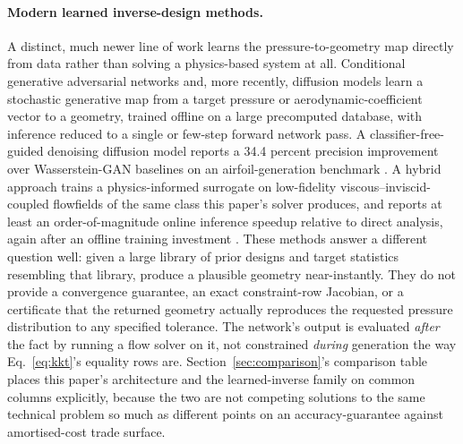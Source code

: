 \paragraph{Modern learned inverse-design methods.} A distinct, much newer line
of work learns the pressure-to-geometry map directly from data rather than
solving a physics-based system at all. Conditional generative adversarial
networks \citep{yilmaz2020cgan} and, more recently, diffusion models learn a
stochastic generative map from a target pressure or aerodynamic-coefficient
vector to a geometry, trained offline on a large precomputed database, with
inference reduced to a single or few-step forward network pass. A
classifier-free-guided denoising diffusion model reports a 34.4 percent
precision improvement over Wasserstein-GAN baselines on an airfoil-generation
benchmark \citep{deng2025cddpm}. A hybrid approach trains a physics-informed
surrogate on low-fidelity viscous--inviscid-coupled flowfields of the same
class this paper's solver produces, and reports at least an
order-of-magnitude online inference speedup relative to direct analysis, again
after an offline training investment \citep{wong2024lfpinn}. These methods answer a different
question well: given a large library of prior designs and target statistics
resembling that library, produce a plausible geometry near-instantly. They do
not provide a convergence guarantee, an exact constraint-row Jacobian, or a
certificate that the returned geometry actually reproduces the requested
pressure distribution to any specified tolerance. The network's output is
evaluated \emph{after} the fact by running a flow solver on it, not
constrained \emph{during} generation the way Eq.~\eqref{eq:kkt}'s equality
rows are. Section~\ref{sec:comparison}'s comparison table places this paper's
architecture and the learned-inverse family on common columns explicitly,
because the two are not competing solutions to the same technical problem so
much as different points on an accuracy-guarantee against amortised-cost
trade surface.

